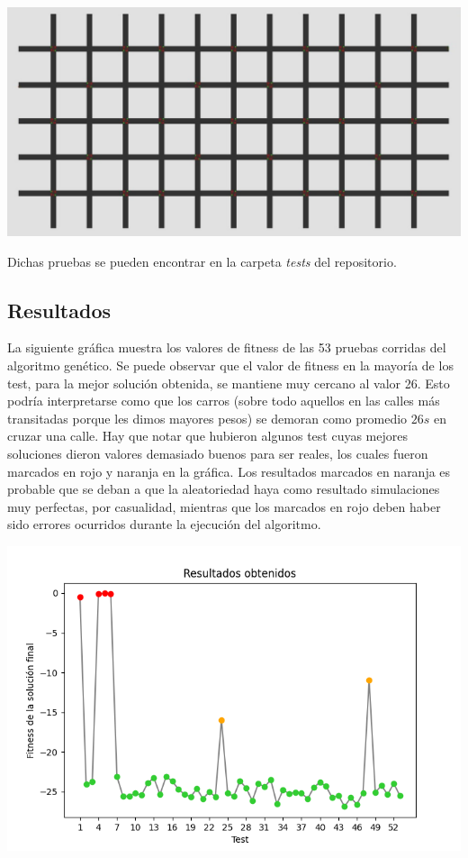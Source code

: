 \documentclass[colorinlistoftodos,twoside,twocolumn]{article} %
\begin{document}
	\begin{center}
		\includegraphics[width=\columnwidth]{map.jpg}
	\end{center}
	
	Dichas pruebas se pueden encontrar en la carpeta \emph{tests} del repositorio. 

	\subsection{Resultados}
	
	La siguiente gr\'afica muestra los valores de fitness de las 53 pruebas corridas del algoritmo gen\'etico. Se puede observar que el valor de fitness en la mayor\'ia de los test, para la mejor soluci\'on obtenida, se mantiene muy cercano al valor 26. Esto podr\'ia interpretarse como que los carros (sobre todo aquellos en las calles m\'as transitadas porque les dimos mayores pesos) se demoran como promedio $26s$ en cruzar una calle. Hay que notar que hubieron algunos test cuyas mejores soluciones dieron valores demasiado buenos para ser reales, los cuales fueron marcados en rojo y naranja en la gr\'afica. Los resultados marcados en naranja es probable que se deban a que la aleatoriedad haya como resultado simulaciones muy perfectas, por casualidad, mientras que los marcados en rojo deben haber sido errores ocurridos durante la ejecuci\'on del algoritmo.
	
	\begin{center}
		\includegraphics[width=\columnwidth]{graphic_resultados_obtenidos.png}
	\end{center}
\end{document}
